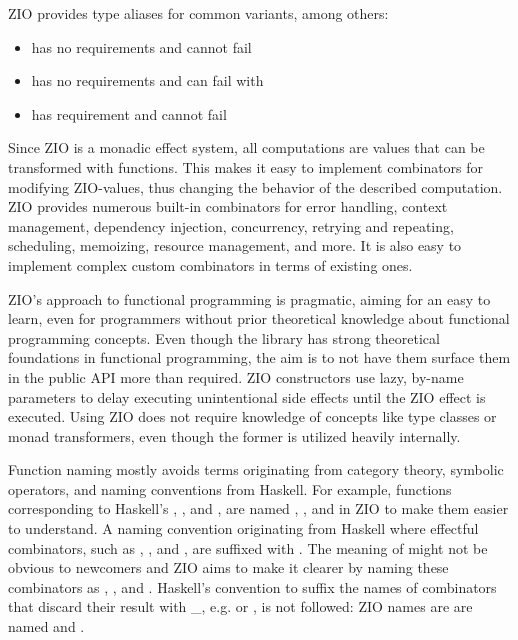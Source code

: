 ZIO provides type aliases for common variants, among others:
\begin{itemize}
    \item {} has no requirements and cannot fail
    \item {} has no requirements and can fail with 
    \item {} has requirement  and cannot fail
\end{itemize}

Since ZIO is a monadic effect system, all computations are values that can be transformed with functions. This makes it easy to implement combinators for modifying ZIO-values, thus changing the behavior of the described computation. ZIO provides numerous built-in combinators for error handling, context management, dependency injection, concurrency, retrying and repeating, scheduling, memoizing, resource management, and more. It is also easy to implement complex custom combinators in terms of existing ones.

ZIO's approach to functional programming is pragmatic, aiming for an easy to learn, even for programmers without prior theoretical knowledge about functional programming concepts. Even though the library has strong theoretical foundations in functional programming, the aim is to not have them surface them in the public API more than required. ZIO constructors use lazy, by-name parameters to delay executing unintentional side effects until the ZIO effect is executed. Using ZIO does not require knowledge of concepts like type classes or monad transformers, even though the former is utilized heavily internally.

Function naming mostly avoids terms originating from category theory, symbolic operators, and naming conventions from Haskell. For example, functions corresponding to Haskell's , , and , are named , , and  in ZIO to make them easier to understand. A naming convention originating from Haskell where effectful combinators, such as , , and , are suffixed with . The meaning of  might not be obvious to newcomers and ZIO aims to make it clearer by naming these combinators as , , and .
Haskell's convention to suffix the names of combinators that discard their result with \_, e.g.  or , is not followed: ZIO names are are named  and .

